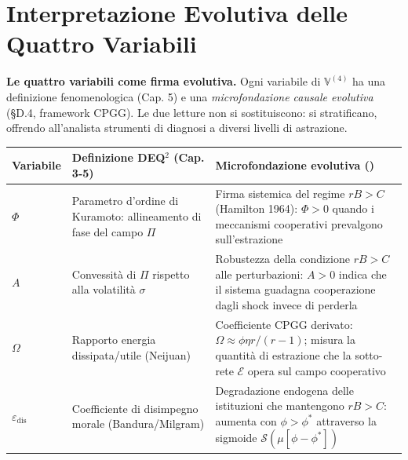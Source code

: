 \section{Interpretazione Evolutiva delle Quattro
Variabili}\label{interpretazione-evolutiva-quattro-variabili}

\Hypoth{} \textbf{Le quattro variabili come firma evolutiva.} Ogni
variabile di \(\mathbb{V}^{(4)}\) ha una definizione fenomenologica
(Cap. 5) e una \emph{microfondazione causale evolutiva} (§D.4, framework
CPGG). Le due letture non si sostituiscono: si stratificano, offrendo
all'analista strumenti di diagnosi a diversi livelli di astrazione.

{\def\LTcaptype{none}
{\small\begin{longtable}[]{@{}
  >{\raggedright\arraybackslash}p{}
  >{\raggedright\arraybackslash}p{}
  >{\raggedright\arraybackslash}p{}@{}}
\toprule\noalign{}
\begin{minipage}[b]{\linewidth}\raggedright
Variabile
\end{minipage} & \begin{minipage}[b]{\linewidth}\raggedright
Definizione DEQ$^2$ (Cap. 3-5)
\end{minipage} & \begin{minipage}[b]{\linewidth}\raggedright
Microfondazione evolutiva (\Hypoth{})
\end{minipage} \\
\midrule\noalign{}
\endhead
\bottomrule\noalign{}
\endlastfoot
\(\Phi\) & Parametro d'ordine di Kuramoto: allineamento di fase del campo
\(\Pi\) & Firma sistemica del regime \(rB > C\) (Hamilton 1964):
\(\Phi > 0\) quando i meccanismi cooperativi prevalgono
sull'estrazione \\ \addlinespace
\(A\) & Convessità di \(\Pi\) rispetto alla volatilità \(\sigma\) & Robustezza
della condizione \(rB > C\) alle perturbazioni: \(A > 0\) indica che il
sistema guadagna cooperazione dagli shock invece di perderla \\ \addlinespace
\(\Omega\) & Rapporto energia dissipata/utile (Neijuan) & Coefficiente
CPGG derivato: \(\Omega \approx \phi\eta r/(r-1)\); misura la quantità di
estrazione che la sotto-rete \(\mathcal{E}\) opera sul campo cooperativo
\\ \addlinespace
\(\varepsilon_{\text{dis}}\) & Coefficiente di disimpegno morale
(Bandura/Milgram) & Degradazione endogena delle istituzioni che mantengono
\(rB > C\): aumenta con \(\phi > \phi^*\) attraverso la sigmoide
\(\mathcal{S}(\mu[\phi - \phi^*])\) \\
\end{longtable}}
}


